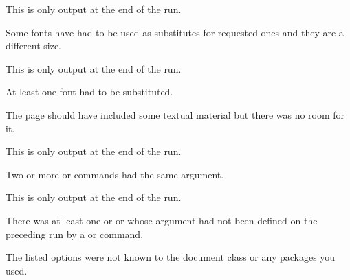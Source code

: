 \begin{plainlist}
    This is only output at the end of the run.

    Some fonts have had to be used as substitutes for requested ones and
they are a different size.

\item[]

    This is only output at the end of the run.

    At least one font had to be substituted.


\item[]

    The page should have included some textual material but there was
no room for it.

\item[]

    This is only output at the end of the run.

    Two or more \cmd{\label} or \cmd{\cite} commands had the same argument.

\item[] 

    This is only output at the end of the run.

    There was at least one \cmd{\ref} or \cmd{\pageref} or \cmd{\cite} 
whose argument had not been defined
on the preceding run by a \cmd{\label} or \cmd{\biblabel} command.


\item[] 

    The listed options were not known to the document class or any packages
you used.







\end{plainlist}
